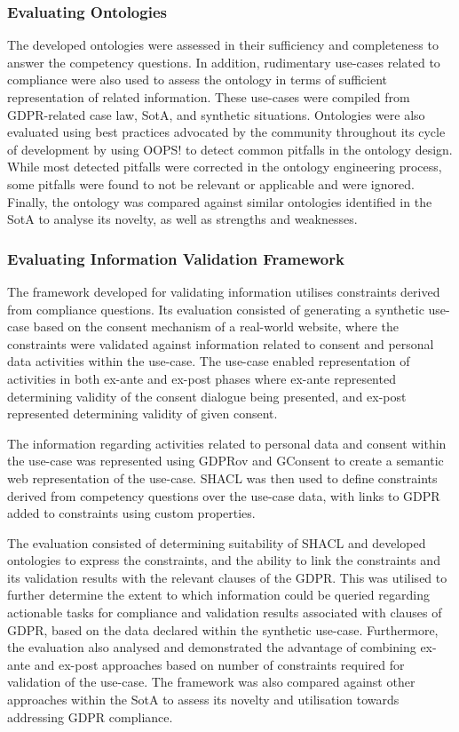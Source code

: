 \subsubsection{Evaluating Ontologies}
The developed ontologies were assessed in their sufficiency and completeness to answer the competency questions. 
In addition, rudimentary use-cases related to compliance were also used to assess the ontology in terms of sufficient representation of related information. These use-cases were compiled from GDPR-related case law, SotA, and synthetic situations.
Ontologies were also evaluated using best practices advocated by the community throughout its cycle of development by using OOPS! \cite{poveda-villalon_oops!_2014} to detect common pitfalls in the ontology design.
While most detected pitfalls were corrected in the ontology engineering process, some pitfalls were found to not be relevant or applicable and were ignored.
Finally, the ontology was compared against similar ontologies identified in the SotA to analyse its novelty, as well as strengths and weaknesses.

\subsubsection{Evaluating Information Validation Framework}
The framework developed for validating information utilises constraints derived from compliance questions.
Its evaluation consisted of generating a synthetic use-case based on the consent mechanism of a real-world website, where the constraints were validated against information related to consent and personal data activities within the use-case.
The use-case enabled representation of activities in both ex-ante and ex-post phases where ex-ante represented determining validity of the consent dialogue being presented, and ex-post represented determining validity of given consent.

The information regarding activities related to personal data and consent within the use-case was represented using GDPRov and GConsent to create a semantic web representation of the use-case.
SHACL was then used to define constraints derived from competency questions over the use-case data, with links to GDPR added to constraints using custom properties.

The evaluation consisted of determining suitability of SHACL and developed ontologies to express the constraints, and the ability to link the constraints and its validation results with the relevant clauses of the GDPR.
This was utilised to further determine the extent to which information could be queried regarding actionable tasks for compliance and validation results associated with clauses of GDPR, based on the data declared within the synthetic use-case.
Furthermore, the evaluation also analysed and demonstrated the advantage of combining ex-ante and ex-post approaches based on number of constraints required for validation of the use-case.
The framework was also compared against other approaches within the SotA to assess its novelty and utilisation towards addressing GDPR compliance.

